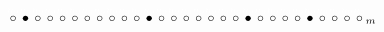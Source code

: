 \documentclass[aspectratio=169,xcolor=dvipsnames]{beamer}
\begin{document}
\begin{frame}
\begin{itemize}
{\[{        \stackrel{{\color{white} n_{9}}}{\circ}
        \stackrel{{\color{white} n_{9}}}{\bullet}
        \stackrel{{\color{white} n_{9}}}{\circ}
        \stackrel{{\color{white} n_{9}}}{\circ}
        \stackrel{{\color{white} n_{9}}}{\circ}
        \stackrel{{\color{white} n_{9}}}{\circ}
        \stackrel{{\color{white} n_{9}}}{\circ}
        \stackrel{{\color{white} n_{9}}}{\circ}
        \stackrel{{\color{white} n_{9}}}{\circ}
        \stackrel{{\color{white} n_{9}}}{\circ}
        \stackrel{{\color{white} n_{9}}}{\circ}
        \stackrel{{\color{white} n_{9}}}{\bullet}
        \stackrel{{\color{white} n_{9}}}{\circ}
        \stackrel{{\color{white} n_{9}}}{\circ}
        \stackrel{{\color{white} n_{9}}}{\circ}
        \stackrel{{\color{white} n_{9}}}{\circ}
        \stackrel{{\color{white} n_{9}}}{\circ}
        \stackrel{{\color{white} n_{9}}}{\circ}
        \stackrel{{\color{white} n_{9}}}{\circ}
        \stackrel{{\color{white} n_{9}}}{\bullet}
        \stackrel{{\color{white} n_{9}}}{\circ}
        \stackrel{{\color{white} n_{9}}}{\circ}
        \stackrel{{\color{white} n_{9}}}{\circ}
        \stackrel{{\color{white} n_{9}}}{\circ}
        \stackrel{{\color{white} n_{9}}}{\bullet}
        \stackrel{{\color{white} n_{9}}}{\circ}
        \stackrel{{\color{white} n_{9}}}{\circ}
        \stackrel{{\color{white} n_{9}}}{\circ}
        \stackrel{{\color{white} n_{9}}}{\circ}
      }_m
     \]
    }%
\end{itemize}
\end{frame}
\end{document}

